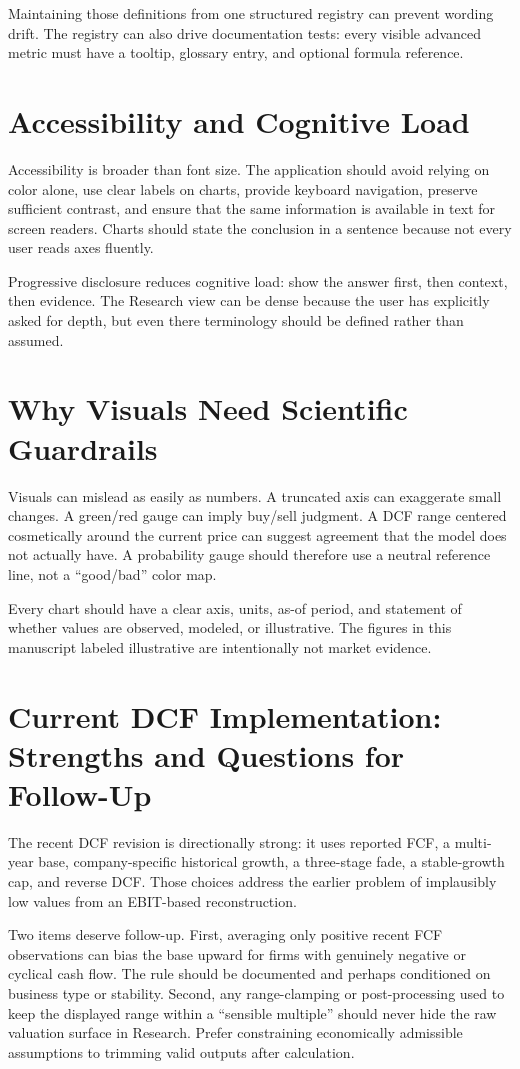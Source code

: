 \documentclass[11pt]{article}
\begin{document}
Maintaining those definitions from one structured registry can prevent wording drift. The registry can also drive documentation tests: every visible advanced metric must have a tooltip, glossary entry, and optional formula reference.

\section{Accessibility and Cognitive Load}
Accessibility is broader than font size. The application should avoid relying on color alone, use clear labels on charts, provide keyboard navigation, preserve sufficient contrast, and ensure that the same information is available in text for screen readers. Charts should state the conclusion in a sentence because not every user reads axes fluently.

Progressive disclosure reduces cognitive load: show the answer first, then context, then evidence. The Research view can be dense because the user has explicitly asked for depth, but even there terminology should be defined rather than assumed.

\section{Why Visuals Need Scientific Guardrails}
Visuals can mislead as easily as numbers. A truncated axis can exaggerate small changes. A green/red gauge can imply buy/sell judgment. A DCF range centered cosmetically around the current price can suggest agreement that the model does not actually have. A probability gauge should therefore use a neutral reference line, not a ``good/bad'' color map.

Every chart should have a clear axis, units, as-of period, and statement of whether values are observed, modeled, or illustrative. The figures in this manuscript labeled illustrative are intentionally not market evidence.

\section{Current DCF Implementation: Strengths and Questions for Follow-Up}
The recent DCF revision is directionally strong: it uses reported FCF, a multi-year base, company-specific historical growth, a three-stage fade, a stable-growth cap, and reverse DCF. Those choices address the earlier problem of implausibly low values from an EBIT-based reconstruction.

Two items deserve follow-up. First, averaging only positive recent FCF observations can bias the base upward for firms with genuinely negative or cyclical cash flow. The rule should be documented and perhaps conditioned on business type or stability. Second, any range-clamping or post-processing used to keep the displayed range within a ``sensible multiple'' should never hide the raw valuation surface in Research. Prefer constraining economically admissible assumptions to trimming valid outputs after calculation.
\end{document}
